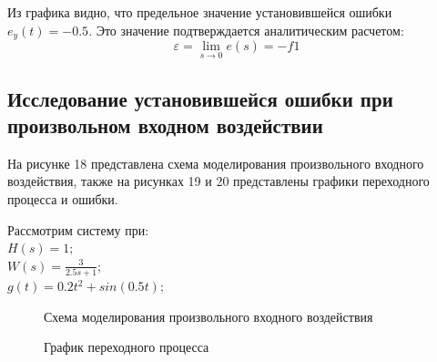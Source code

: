 \documentclass[a4paper, 11pt]{article}
\begin{document}
Из графика видно, что предельное значение установившейся ошибки $e_y(t)=-0.5$. Это значение подтверждается аналитическим расчетом:
\begin{equation}
	\varepsilon = \lim_{s\to 0}{e(s)} = -f1
\end{equation}

\newpage
\begin{center}
\section{Исследование установившейся ошибки при произвольном входном воздействии}
\end{center}
На рисунке 18 представлена схема моделирования произвольного входного воздействия, также на рисунках 19 и 20 представлены графики переходного процесса и ошибки.

Рассмотрим систему при:\\

$H(s)=1;$ \\

$W(s)=\frac {3} {2.5s+1};$ \\

$g(t)=0.2t^2+sin(0.5t);$

\begin{figure}[h!]
    \caption{Схема моделирования произвольного входного воздействия}
    \label{two}
\end{figure}

\begin{figure}[h!]
    \caption{График переходного процесса}
    \label{two}
\end{figure}
\end{document}
